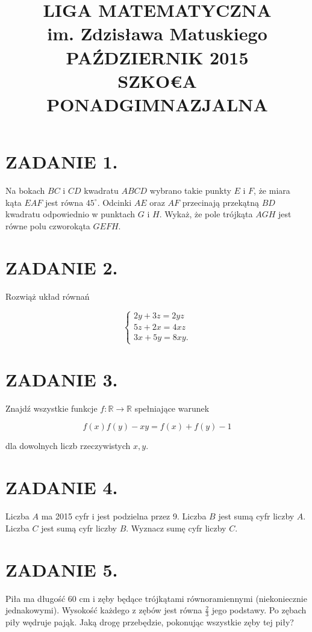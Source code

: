 \documentclass[10pt]{article}
\title{LIGA MATEMATYCZNA \\
 im. Zdzisława Matuskiego \\
 PAŹDZIERNIK 2015 \\
 SZKO€A PONADGIMNAZJALNA }
\author{}
\date{}
\begin{document}
\maketitle
\section*{ZADANIE 1.}
Na bokach \(B C\) i \(C D\) kwadratu \(A B C D\) wybrano takie punkty \(E\) i \(F\), że miara kąta \(E A F\) jest równa \(45^{\circ}\). Odcinki \(A E\) oraz \(A F\) przecinają przekątną \(B D\) kwadratu odpowiednio w punktach \(G\) i \(H\). Wykaż, że pole trójkąta \(A G H\) jest równe polu czworokąta \(G E F H\).

\section*{ZADANIE 2.}
Rozwiąż układ równań

\[
\left\{\begin{array}{l}
2 y+3 z=2 y z \\
5 z+2 x=4 x z \\
3 x+5 y=8 x y .
\end{array}\right.
\]

\section*{ZADANIE 3.}
Znajdź wszystkie funkcje \(f: \mathbb{R} \rightarrow \mathbb{R}\) spełniające warunek

\[
f(x) f(y)-x y=f(x)+f(y)-1
\]

dla dowolnych liczb rzeczywistych \(x, y\).

\section*{ZADANIE 4.}
Liczba \(A\) ma 2015 cyfr i jest podzielna przez 9. Liczba \(B\) jest sumą cyfr liczby \(A\). Liczba \(C\) jest sumą cyfr liczby \(B\). Wyznacz sumę cyfr liczby \(C\).

\section*{ZADANIE 5.}
Piła ma długość 60 cm i zęby będące trójkątami równoramiennymi (niekoniecznie jednakowymi). Wysokość każdego z zębów jest równa \(\frac{2}{3}\) jego podstawy. Po zębach piły wędruje pająk. Jaką drogę przebędzie, pokonując wszystkie zęby tej piły?
\end{document}

